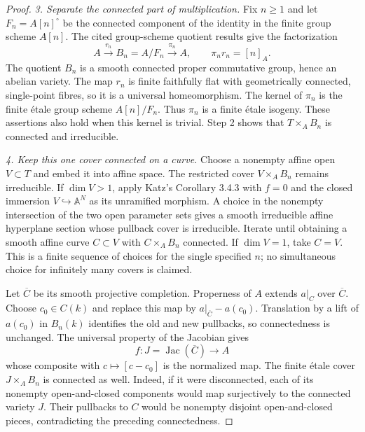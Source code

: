 \documentclass[11pt,a4paper]{article}
\theoremstyle{definition}\newtheorem{definition}[theorem]{Definition}
\theoremstyle{remark}\newtheorem{remark}[theorem]{Remark}
\begin{document}
\begin{proof}
\emph{3. Separate the connected part of multiplication.}
Fix $n\geq1$ and let $F_n=A[n]^\circ$ be the connected
component of the identity in the finite group scheme
$A[n]$.  The cited group-scheme quotient results give
the factorization
\[
 A\xrightarrow{r_n}B_n=A/F_n
   \xrightarrow{\pi_n}A,\qquad
 \pi_n r_n=[n]_A.                                  \tag{CC.ALB.3}
\]
The quotient $B_n$ is a smooth connected proper
commutative group, hence an abelian variety.
The map $r_n$ is finite faithfully flat with geometrically
connected, single-point fibres, so it is a universal
homeomorphism.  The kernel of $\pi_n$ is the finite
\'{e}tale group scheme $A[n]/F_n$.  Thus $\pi_n$ is a
finite \'{e}tale isogeny.  These assertions also hold
when this kernel is trivial.
Step 2 shows that $T\times_A B_n$ is connected and
irreducible.

\emph{4. Keep this one cover connected on a curve.}
Choose a nonempty affine open $V\subset T$ and embed
it into affine space.  The restricted cover
$V\times_A B_n$ remains irreducible.  If $\dim V>1$,
apply Katz's Corollary 3.4.3 with $f=0$ and the closed
immersion $V\hookrightarrow\mathbb A^N$ as its
unramified morphism.  A choice in the nonempty
intersection of the two open parameter sets gives a
smooth irreducible affine hyperplane section whose
pullback cover is irreducible.  Iterate until obtaining
a smooth affine curve $C\subset V$ with
$C\times_A B_n$ connected.  If $\dim V=1$, take
$C=V$.  This is a finite sequence of choices for the
single specified $n$; no simultaneous choice for
infinitely many covers is claimed.

Let $\overline C$ be its smooth projective completion.
Properness of $A$ extends $a|_C$ over $\overline C$.
Choose $c_0\in C(k)$ and replace this map by
$a|_{\overline C}-a(c_0)$.  Translation by a lift of
$a(c_0)$ in $B_n(k)$ identifies the old and new
pullbacks, so connectedness is unchanged.
The universal property of the Jacobian gives
\[
 f:J=\operatorname{Jac}(\overline C)\longrightarrow A
\]
whose composite with $c\mapsto[c-c_0]$ is the
normalized map.  The finite \'{e}tale cover
$J\times_A B_n$ is connected as well.
Indeed, if it were disconnected, each of its
nonempty open-and-closed components would map
surjectively to the connected variety $J$.
Their pullbacks to $C$ would be nonempty disjoint
open-and-closed pieces, contradicting the preceding
connectedness.


\end{proof}
\end{document}

